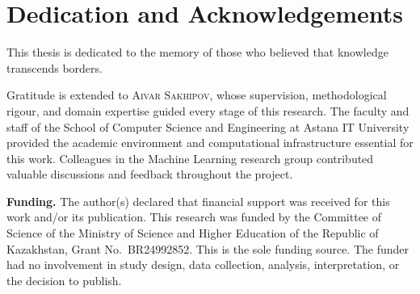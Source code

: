 %
%
\chapter{Dedication and Acknowledgements}
\begin{SingleSpace}

This thesis is dedicated to the memory of those who believed that knowledge transcends borders.

\vspace{1cm}

Gratitude is extended to \textsc{Aivar Sakhipov}, whose supervision, methodological rigour, and domain expertise guided every stage of this research. The faculty and staff of the School of Computer Science and Engineering at Astana IT University provided the academic environment and computational infrastructure essential for this work. Colleagues in the Machine Learning research group contributed valuable discussions and feedback throughout the project.

\vspace{1cm}

\noindent\textbf{Funding.} The author(s) declared that financial support was received for this work and/or its publication. This research was funded by the Committee of Science of the Ministry of Science and Higher Education of the Republic of Kazakhstan, Grant No.~BR24992852. This is the sole funding source. The funder had no involvement in study design, data collection, analysis, interpretation, or the decision to publish.

\end{SingleSpace}
\clearpage